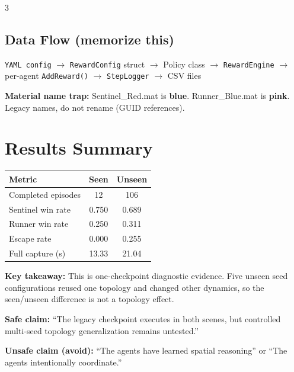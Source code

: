 \documentclass[10pt,landscape,a4paper]{article}
\begin{document}
\begin{multicols}{3}
\subsection{Data Flow (memorize this)}
\texttt{YAML config} $\rightarrow$ \texttt{RewardConfig} struct $\rightarrow$ Policy class $\rightarrow$ \texttt{RewardEngine} $\rightarrow$ per-agent \texttt{AddReward()} $\rightarrow$ \texttt{StepLogger} $\rightarrow$ CSV files

\vspace{2pt}
{\small\textbf{Material name trap:} Sentinel\_Red.mat is \textbf{blue}. Runner\_Blue.mat is \textbf{pink}. Legacy names, do not rename (GUID references).}

\section{Results Summary}

\begin{tabular}{@{}lcc@{}}
\toprule
Metric & Seen & Unseen \\
\midrule
Completed episodes & 12 & 106 \\
Sentinel win rate & 0.750 & 0.689 \\
Runner win rate & 0.250 & 0.311 \\
Escape rate & 0.000 & 0.255 \\
Full capture (s) & 13.33 & 21.04 \\
\bottomrule
\end{tabular}

\textbf{Key takeaway:} This is one-checkpoint diagnostic evidence. Five unseen seed configurations reused one topology and changed other dynamics, so the seen/unseen difference is not a topology effect.

\textbf{Safe claim:} ``The legacy checkpoint executes in both scenes, but controlled multi-seed topology generalization remains untested.''

\textbf{Unsafe claim (avoid):} ``The agents have learned spatial reasoning'' or ``The agents intentionally coordinate.''

\end{multicols}
\end{document}
